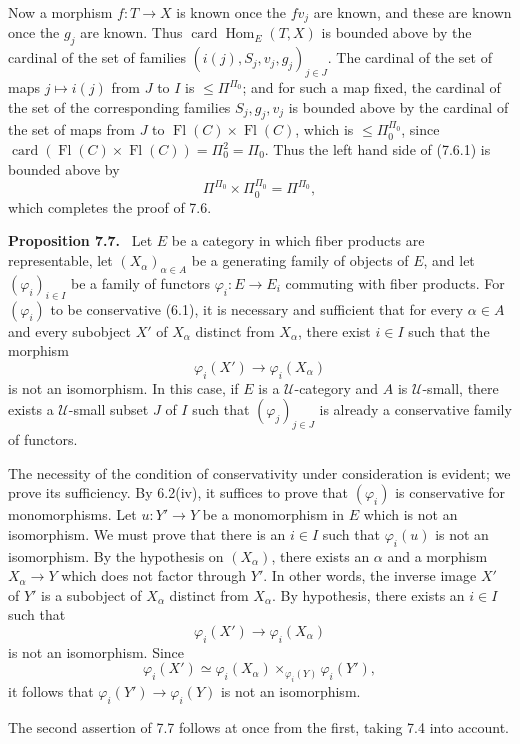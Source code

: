\documentclass[11pt]{article}
\newcommand{\U}{\mathcal{U}}
\newcommand{\Hom}{\operatorname{Hom}}
\newcommand{\Fl}{\operatorname{Fl}}
\newcommand{\card}{\operatorname{card}}
\newenvironment{statement}[1]{\par\medskip\noindent\textbf{#1.}\ }{\par\medskip}
\begin{document}
Now a morphism $f:T\to X$ is known once the $fv_j$ are known, and these are known once the $g_j$ are known. Thus $\card\Hom_E(T,X)$ is bounded above by the cardinal of the set of families $(i(j),S_j,v_j,g_j)_{j\in J}$. The cardinal of the set of maps $j\mapsto i(j)$ from $J$ to $I$ is $\leq\Pi^{\Pi_0}$; and for such a map fixed, the cardinal of the set of the corresponding families $S_j,g_j,v_j$ is bounded above by the cardinal of the set of maps from $J$ to $\Fl(C)\times\Fl(C)$, which is $\leq\Pi_0^{\Pi_0}$, since $\card(\Fl(C)\times\Fl(C))=\Pi_0^2=\Pi_0$. Thus the left hand side of (7.6.1) is bounded above by
\[
\Pi^{\Pi_0}\times\Pi_0^{\Pi_0}=\Pi^{\Pi_0},
\]
which completes the proof of 7.6.

\begin{statement}{Proposition 7.7}
Let $E$ be a category in which fiber products are representable, let $(X_\alpha)_{\alpha\in A}$ be a generating family of objects of $E$, and let $(\varphi_i)_{i\in I}$ be a family of functors $\varphi_i:E\to E_i$ commuting with fiber products. For $(\varphi_i)$ to be conservative (6.1), it is necessary and sufficient that for every $\alpha\in A$ and every subobject $X'$ of $X_\alpha$ distinct from $X_\alpha$, there exist $i\in I$ such that the morphism
\[
\varphi_i(X')\longrightarrow \varphi_i(X_\alpha)
\]
is not an isomorphism. In this case, if $E$ is a $\U$-category and $A$ is $\U$-small, there exists a $\U$-small subset $J$ of $I$ such that $(\varphi_j)_{j\in J}$ is already a conservative family of functors.
\end{statement}

The necessity of the condition of conservativity under consideration is evident; we prove its sufficiency. By 6.2(iv), it suffices to prove that $(\varphi_i)$ is conservative for monomorphisms. Let $u:Y'\to Y$ be a monomorphism in $E$ which is not an isomorphism. We must prove that there is an $i\in I$ such that $\varphi_i(u)$ is not an isomorphism. By the hypothesis on $(X_\alpha)$, there exists an $\alpha$ and a morphism $X_\alpha\to Y$ which does not factor through $Y'$. In other words, the inverse image $X'$ of $Y'$ is a subobject of $X_\alpha$ distinct from $X_\alpha$. By hypothesis, there exists an $i\in I$ such that
\[
\varphi_i(X')\longrightarrow \varphi_i(X_\alpha)
\]
is not an isomorphism. Since
\[
\varphi_i(X')\simeq \varphi_i(X_\alpha)\times_{\varphi_i(Y)}\varphi_i(Y'),
\]
it follows that $\varphi_i(Y')\to\varphi_i(Y)$ is not an isomorphism.

The second assertion of 7.7 follows at once from the first, taking 7.4 into account.
\end{document}
